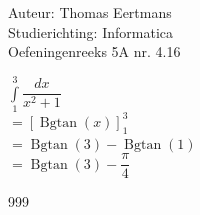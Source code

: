 \documentclass[a4paper]{article}
\newcommand{\bepint}{\displaystyle\int\limits}
\newcommand{\Bgtan}{\operatorname{Bgtan}}
\begin{document}
  
\noindent \large Auteur: Thomas Eertmans \\
\noindent \large Studierichting: Informatica\\
\noindent \large Oefeningenreeks 5A nr. 4.16\\

\medskip

\normalsize

$\bepint_1^3 \dfrac{dx}{x^2+1}$ \\

$= \left[\Bgtan(x)\right]^3_1$ \\

$= \Bgtan(3) - \Bgtan(1)$ \\

$= \Bgtan(3) - \dfrac{\pi}{4}$

\begin{thebibliography}{999}
\end{thebibliography}
\end{document}
